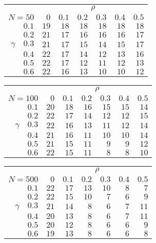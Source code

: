 \begin{tabular}{r|rrrrrr}
\hline\hline
 &\multicolumn{6}{c}{$\rho$} \\ 
 $N = 50$ & $0$ & $0.1$ & $0.2$ & $0.3$ & $0.4$ & $0.5$ \\ 
 \hline$0.1$ & $19$ & $18$ & $18$ & $18$ & $18$ & $18$\\ 
$0.2$ & $21$ & $17$ & $16$ & $16$ & $16$ & $17$\\ 
$\gamma\quad$$0.3$ & $21$ & $17$ & $15$ & $14$ & $15$ & $17$\\ 
$0.4$ & $22$ & $17$ & $14$ & $12$ & $13$ & $16$\\ 
$0.5$ & $22$ & $17$ & $12$ & $11$ & $12$ & $13$\\ 
$0.6$ & $22$ & $16$ & $13$ & $10$ & $10$ & $12$\\ 
 \hline 
 \end{tabular}
 
 \vspace{2em} 
 
\begin{tabular}{r|rrrrrr}
\hline\hline
 &\multicolumn{6}{c}{$\rho$} \\ 
 $N = 100$ & $0$ & $0.1$ & $0.2$ & $0.3$ & $0.4$ & $0.5$ \\ 
 \hline$0.1$ & $20$ & $18$ & $16$ & $15$ & $15$ & $14$\\ 
$0.2$ & $22$ & $17$ & $14$ & $12$ & $12$ & $15$\\ 
$\gamma\quad$$0.3$ & $22$ & $16$ & $13$ & $11$ & $12$ & $14$\\ 
$0.4$ & $21$ & $16$ & $11$ & $10$ & $10$ & $14$\\ 
$0.5$ & $21$ & $15$ & $11$ & $9$ & $9$ & $12$\\ 
$0.6$ & $22$ & $15$ & $11$ & $8$ & $8$ & $10$\\ 
 \hline 
 \end{tabular}
 
 \vspace{2em} 
 
\begin{tabular}{r|rrrrrr}
\hline\hline
 &\multicolumn{6}{c}{$\rho$} \\ 
 $N = 500$ & $0$ & $0.1$ & $0.2$ & $0.3$ & $0.4$ & $0.5$ \\ 
 \hline$0.1$ & $22$ & $17$ & $13$ & $10$ & $8$ & $7$\\ 
$0.2$ & $22$ & $15$ & $10$ & $7$ & $6$ & $9$\\ 
$\gamma\quad$$0.3$ & $21$ & $14$ & $8$ & $6$ & $7$ & $11$\\ 
$0.4$ & $20$ & $13$ & $8$ & $6$ & $7$ & $11$\\ 
$0.5$ & $20$ & $12$ & $8$ & $6$ & $6$ & $9$\\ 
$0.6$ & $19$ & $13$ & $8$ & $6$ & $6$ & $8$\\ 
 \hline 
 \end{tabular}
